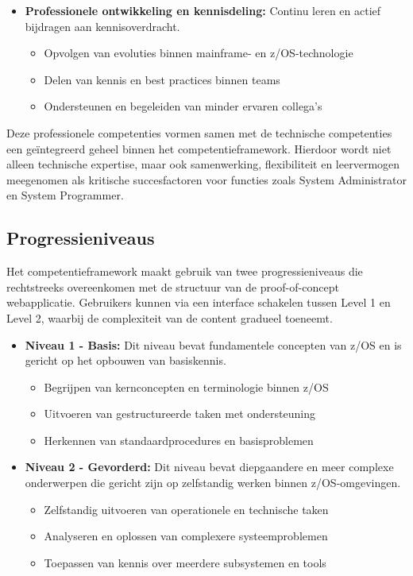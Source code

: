 \begin{itemize}
	\item \textbf{Professionele ontwikkeling en kennisdeling:} Continu leren en actief bijdragen aan kennisoverdracht.
	\begin{itemize}
		\item Opvolgen van evoluties binnen mainframe- en z/OS-technologie
		\item Delen van kennis en best practices binnen teams
		\item Ondersteunen en begeleiden van minder ervaren collega’s
	\end{itemize}
	
\end{itemize}

Deze professionele competenties vormen samen met de technische competenties een geïntegreerd geheel binnen het competentieframework. Hierdoor wordt niet alleen technische expertise, maar ook samenwerking, flexibiliteit en leervermogen meegenomen als kritische succesfactoren voor functies zoals System Administrator en System Programmer.

\subsection{Progressieniveaus}

Het competentieframework maakt gebruik van twee progressieniveaus die rechtstreeks overeenkomen met de structuur van de proof-of-concept webapplicatie. Gebruikers kunnen via een interface schakelen tussen Level 1 en Level 2, waarbij de complexiteit van de content gradueel toeneemt.

\begin{itemize}
	
	\item \textbf{Niveau 1 - Basis:} Dit niveau bevat fundamentele concepten van z/OS en is gericht op het opbouwen van basiskennis.
	\begin{itemize}
		\item Begrijpen van kernconcepten en terminologie binnen z/OS
		\item Uitvoeren van gestructureerde taken met ondersteuning
		\item Herkennen van standaardprocedures en basisproblemen
	\end{itemize}
	
	\item \textbf{Niveau 2 - Gevorderd:} Dit niveau bevat diepgaandere en meer complexe onderwerpen die gericht zijn op zelfstandig werken binnen z/OS-omgevingen.
	\begin{itemize}
		\item Zelfstandig uitvoeren van operationele en technische taken
		\item Analyseren en oplossen van complexere systeemproblemen
		\item Toepassen van kennis over meerdere subsystemen en tools
	\end{itemize}
	
\end{itemize}

